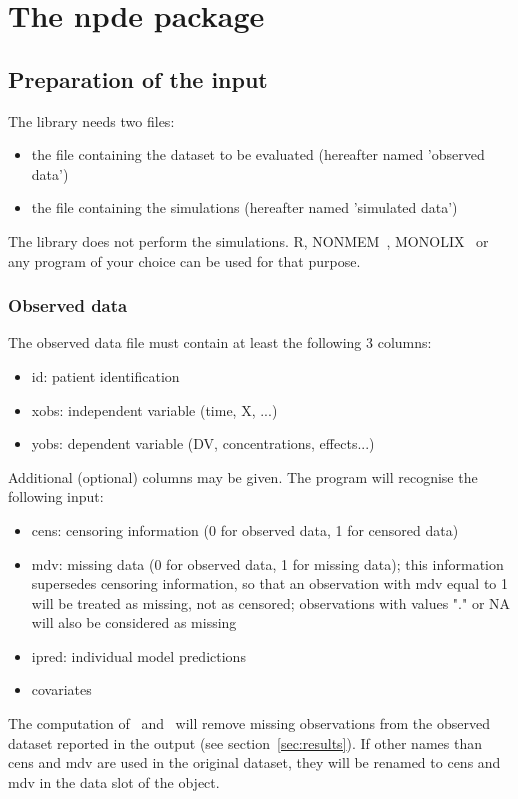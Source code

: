 \newpage \section{The npde package} \label{sec:progdesc}

\subsection{Preparation of the input}

\hskip 18pt The library needs two files: 
\begin{itemize} 
\item the file containing the dataset to be evaluated (hereafter named 'observed data') \item the file containing 
the simulations (hereafter named 'simulated data') 
\end{itemize} 
The library does not perform the simulations. {\sf R}, {\sf NONMEM}~\cite{NONMEM}, {\sf 
MONOLIX}~\cite{Monolix} or any program of your choice can be used for that purpose.

\subsubsection{Observed data}

\hskip 18pt The observed data file must contain at least the following 3 columns: 
\begin{itemize} 
\item id: patient identification 
\item xobs: independent variable (time, X, ...) 
\item yobs: dependent variable (DV, concentrations, 
effects...) 
\end{itemize} 
Additional (optional) columns may be given. The program will recognise the following 
input: 
\begin{itemize} 
\item cens: censoring information (0 for observed data, 1 for censored data) 
\item mdv: missing data (0 for observed data, 1 for missing data); this information supersedes censoring 
information, so that an observation with mdv equal to 1 will be treated as missing, not as censored; observations 
with values "." or NA will also be considered as missing 
\item ipred: individual model predictions 
\item covariates 
\end{itemize} 
The computation of \pd~and \npde~will remove missing observations from the observed dataset reported in the output 
(see section~\ref{sec:results}). If other names than {\sf cens} and {\sf mdv} are used in the original dataset, 
they will be renamed to {\sf cens} and {\sf mdv} in the {\sf data} slot of the object.

